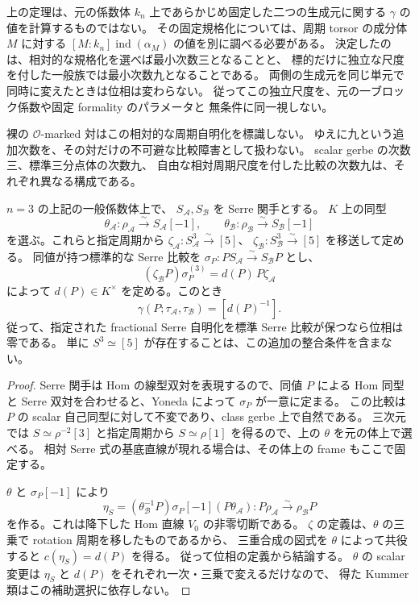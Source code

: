 \begin{remark}[固定規格化と相対的な自由尺度]
\label{rem:nfm-period-frame-scope}
上の定理は、元の係数体 $k_n$ 上であらかじめ固定した二つの生成元に関する
$\gamma$ の値を計算するものではない。
その固定規格化については、周期 torsor の成分体 $M$ に対する
$[M:k_n]\operatorname{ind}(\alpha_M)$ の値を別に調べる必要がある。
決定したのは、相対的な規格化を選べば最小次数三となることと、
標的だけに独立な尺度を付した一般族では最小次数九となることである。
両側の生成元を同じ単元で同時に変えたときは位相は変わらない。
従ってこの独立尺度を、元の一ブロック係数や固定 formality のパラメータと
無条件に同一視しない。

裸の $\mathcal O$-marked 対はこの相対的な周期自明化を標識しない。
ゆえに九という追加次数を、その対だけの不可避な比較障害として扱わない。
scalar gerbe の次数三、標準三分点体の次数九、
自由な相対周期尺度を付した比較の次数九は、それぞれ異なる構成である。
\end{remark}

\begin{lemma}
\label{lem:nfm-period-phase-fractional-serre}
$n=3$ の上記の一般係数体上で、
$S_{\mathcal A},S_{\mathcal B}$ を Serre 関手とする。
$K$ 上の同型
\[
 \theta_{\mathcal A}:\rho_{\mathcal A}\xrightarrow{\sim}S_{\mathcal A}[-1],
 \qquad
 \theta_{\mathcal B}:\rho_{\mathcal B}\xrightarrow{\sim}S_{\mathcal B}[-1]
\]
を選ぶ。これらと指定周期から
$\zeta_{\mathcal A}:S_{\mathcal A}^3\xrightarrow{\sim}[5]$、
$\zeta_{\mathcal B}:S_{\mathcal B}^3\xrightarrow{\sim}[5]$
を移送して定める。
同値が持つ標準的な Serre 比較を
$\sigma_P:PS_{\mathcal A}\xrightarrow{\sim}S_{\mathcal B}P$ とし、
\[
 (\zeta_{\mathcal B}P)\sigma_P^{(3)}
       =d(P)\,P\zeta_{\mathcal A}
\]
によって $d(P)\in K^\times$ を定める。このとき
\[
 \gamma(P;\tau_{\mathcal A},\tau_{\mathcal B})=[d(P)^{-1}].
\]
従って、指定された fractional Serre 自明化を標準 Serre 比較が保つなら位相は零である。
単に $S^3\simeq[5]$ が存在することは、この追加の整合条件を含まない。
\end{lemma}

\begin{proof}
Serre 関手は Hom の線型双対を表現するので、同値 $P$ による Hom 同型と
Serre 双対を合わせると、Yoneda によって $\sigma_P$ が一意に定まる。
この比較は $P$ の scalar 自己同型に対して不変であり、class gerbe 上で自然である。
三次元では $S\simeq\rho^{-2}[3]$ と指定周期から
$S\simeq\rho[1]$ を得るので、上の $\theta$ を元の体上で選べる。
相対 Serre 式の基底直線が現れる場合は、その体上の frame もここで固定する。

$\theta$ と $\sigma_P[-1]$ により
\[
 \eta_S=(\theta_{\mathcal B}^{-1}P)
          \sigma_P[-1](P\theta_{\mathcal A})
 :P\rho_{\mathcal A}\xrightarrow{\sim}\rho_{\mathcal B}P
\]
を作る。これは降下した Hom 直線 $V_0$ の非零切断である。
$\zeta$ の定義は、$\theta$ の三乗で rotation 周期を移したものであるから、
三重合成の図式を $\theta$ によって共役すると
$c(\eta_S)=d(P)$ を得る。
従って位相の定義から結論する。
$\theta$ の scalar 変更は $\eta_S$ と $d(P)$ をそれぞれ一次・三乗で変えるだけなので、
得た Kummer 類はこの補助選択に依存しない。
\end{proof}

